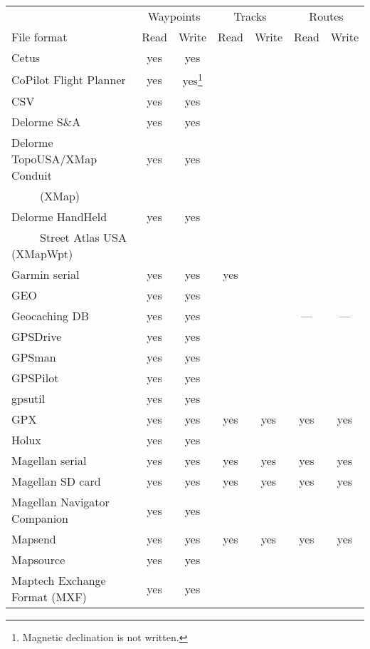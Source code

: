 \documentclass[12pt]{article}
\begin{document}
\begin{tabular}{|l|cc|cc|cc|}
\hline
							&	\multicolumn{2}{c}{Waypoints}	&	\multicolumn{2}{c}{Tracks}	&	\multicolumn{2}{c|}{Routes} \\
File format 	& Read 	& Write									& Read & Write								& Read & Write\\
\hline
\hline
Cetus										& yes		& yes		&				&				&				& 			\\
CoPilot Flight Planner	& yes		& yes\footnote{Magnetic declination is not written.}
																				&				&				&				& 			\\
CSV											& yes		& yes		&				&				&				& 			\\
Delorme S\&A						& yes		& yes		&				&				&				& 			\\
Delorme TopoUSA/XMap Conduit 
												& yes		& yes		&				&				&				& 			\\
~~~~~(XMap)							& & & & & & \\
Delorme HandHeld 				& yes		& yes		&				&				&				& 			\\
~~~~~Street Atlas USA (XMapWpt) & & & & & & \\
Garmin serial						& yes		& yes		&	yes		&				&				& 			\\      
GEO											& yes		& yes		&				&				&				& 			\\
Geocaching DB						& yes		& yes		&				&				&	---		& ---		\\
GPSDrive								& yes		& yes		&				&				&				& 			\\
GPSman									& yes		& yes		&				&				&				& 			\\
GPSPilot								& yes		& yes		&				&				&				& 			\\
gpsutil									& yes		& yes		&				&				&				& 			\\
GPX											& yes		& yes		&	yes		&	yes		&	yes		& yes		\\
Holux										& yes		& yes		&				&				&				& 			\\
Magellan serial					& yes		& yes		&	yes		&	yes		&	yes		& yes		\\
Magellan SD card				& yes		& yes		&	yes		&	yes		&	yes		& yes		\\
Magellan Navigator Companion
      									& yes		& yes		&				&				&				& 			\\
Mapsend									& yes		& yes		&	yes		&	yes		&	yes		& yes		\\
Mapsource								& yes		& yes		&				&				&				& 			\\
Maptech Exchange Format (MXF)
												& yes		& yes		&				&				&				& 			\\

\end{tabular}
\end{document}
